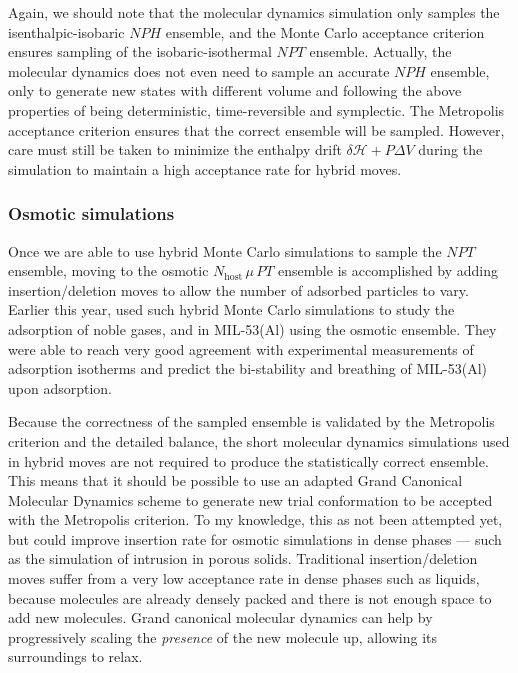 \documentclass[thesis]{subfiles}
\begin{document}
Again, we should note that the molecular dynamics simulation only samples the
is\-enthalpic-iso\-baric $NPH$ ensemble, and the Monte Carlo acceptance
criterion ensures sampling of the isobaric-isothermal $NPT$ ensemble. Actually,
the molecular dynamics does not even need to sample an accurate $NPH$ ensemble,
only to generate new states with different volume and following the above
properties of being deterministic, time-reversible and symplectic. The
Metropolis acceptance criterion ensures that the correct ensemble will be
sampled. However, care must still be taken to minimize the enthalpy drift
$\delta \mathcal{H} + P \Delta V$ during the simulation to maintain a high
acceptance rate for hybrid moves.

\subsubsection{Osmotic simulations}

Once we are able to use hybrid Monte Carlo simulations to sample the $NPT$
ensemble, moving to the osmotic $N_\text{host}\,\mu\,PT$ ensemble is
accomplished by adding insertion/deletion moves to allow the number of adsorbed
particles to vary. Earlier this year, \citeauthor{Rogge2019}\cite{Rogge2019} used
such hybrid Monte Carlo simulations to study the adsorption of noble gases, 
and  in MIL-53(Al) using the osmotic ensemble. They were able to reach
very good agreement with experimental measurements of adsorption isotherms and
predict the bi-stability and breathing of MIL-53(Al) upon adsorption.

Because the correctness of the sampled ensemble is validated by the Metropolis
criterion and the detailed balance, the short molecular dynamics simulations
used in hybrid moves are not required to produce the statistically correct
ensemble. This means that it should be possible to use an adapted Grand
Canonical Molecular Dynamics scheme to generate new trial conformation to be
accepted with the Metropolis criterion. To my knowledge, this as not been
attempted yet, but could improve insertion rate for osmotic simulations in dense
phases --- such as the simulation of intrusion in porous solids. Traditional
insertion/deletion moves suffer from a very low acceptance rate in dense phases
such as liquids, because molecules are already densely packed and there is not
enough space to add new molecules. Grand canonical molecular dynamics can help
by progressively scaling the \emph{presence} of the new molecule up, allowing
its surroundings to relax.
\end{document}

